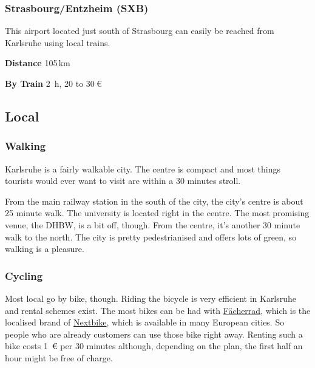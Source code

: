 \begin{multicols}{2}
\subsubsection{Strasbourg/Entzheim (SXB)}

This airport located just south of Strasbourg can easily be reached from Karlsruhe
using local trains.

\begin{labeling}{\hspace*{10ex}}
  \item[\bf Distance] 105\,km
  \item[\bf By Train] \SI{2}{\hour}, 20 to $\SI{30}{\euro}$
\end{labeling}

\end{multicols}

\newpage


\subsection{Local}

\subsubsection{Walking}
Karlsruhe is a fairly walkable city.
The centre is compact and most things tourists would ever want to visit
are within a 30 minutes stroll.

From the main railway station in the south of the city,
the city's centre is about 25 minute walk.
The university is located right in the centre.
The most promising venue, the DHBW, is a bit off, though.
From the centre, it's another 30 minute walk to the north.
The city is pretty pedestrianised and offers lots of green,
so walking is a pleasure.

\subsubsection{Cycling}
Most local go by bike, though.
Riding the bicycle is very efficient in Karlsruhe and
rental schemes exist.
The most bikes can be had with \href{http://www.faecherrad.de/de/karlsruhe/preise/}{Fächerrad},
which is the localised brand of \href{http://www.nextbike.de/de/news/das-karlsruher-leihfahrrad-hei%C3%9Ft-f%C3%A4cherrad/}{Nextbike},
which is available in many European cities.
So people who are already customers can use those bike right away.
Renting such a bike costs \SI{1}{\euro} per 30 minutes although,
depending on the plan, the first half an hour might be free of charge.

